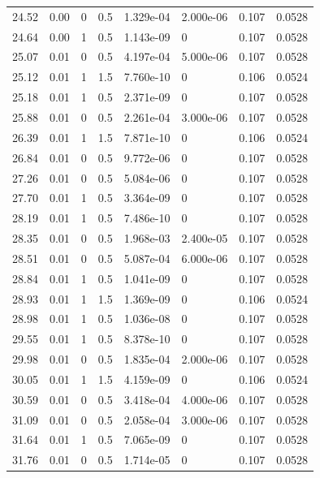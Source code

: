 \documentclass[preview]{standalone}
\begin{document}
{{{\begin{tabular}{L{1.2cm}C{1.2cm} C{0.3cm}C{0.5cm} C{1.4cm}C{1.4cm} C{1.4cm}C{1.4cm}}
  24.52  &  0.00  & 0     & 0.5 &  1.329e-04  & 2.000e-06  & 0.107 &  0.0528   \\ 
  24.64  &  0.00  & 1     & 0.5 &  1.143e-09  & 0  & 0.107 &  0.0528   \\ 
  25.07  &  0.01  & 0     & 0.5 &  4.197e-04  & 5.000e-06  & 0.107 &  0.0528   \\ 
  25.12  &  0.01  & 1     & 1.5 &  7.760e-10  & 0  & 0.106 &  0.0524   \\ 
  25.18  &  0.01  & 1     & 0.5 &  2.371e-09  & 0  & 0.107 &  0.0528   \\ 
  25.88  &  0.01  & 0     & 0.5 &  2.261e-04  & 3.000e-06  & 0.107 &  0.0528   \\ 
  26.39  &  0.01  & 1     & 1.5 &  7.871e-10  & 0  & 0.106 &  0.0524   \\ 
  26.84  &  0.01  & 0     & 0.5 &  9.772e-06  & 0  & 0.107 &  0.0528   \\ 
  27.26  &  0.01  & 0     & 0.5 &  5.084e-06  & 0  & 0.107 &  0.0528   \\ 
  27.70  &  0.01  & 1     & 0.5 &  3.364e-09  & 0  & 0.107 &  0.0528   \\ 
  28.19  &  0.01  & 1     & 0.5 &  7.486e-10  & 0  & 0.107 &  0.0528   \\ 
  28.35  &  0.01  & 0     & 0.5 &  1.968e-03  & 2.400e-05  & 0.107 &  0.0528   \\ 
  28.51  &  0.01  & 0     & 0.5 &  5.087e-04  & 6.000e-06  & 0.107 &  0.0528   \\ 
  28.84  &  0.01  & 1     & 0.5 &  1.041e-09  & 0  & 0.107 &  0.0528   \\ 
  28.93  &  0.01  & 1     & 1.5 &  1.369e-09  & 0  & 0.106 &  0.0524   \\ 
  28.98  &  0.01  & 1     & 0.5 &  1.036e-08  & 0  & 0.107 &  0.0528   \\ 
  29.55  &  0.01  & 1     & 0.5 &  8.378e-10  & 0  & 0.107 &  0.0528   \\ 
  29.98  &  0.01  & 0     & 0.5 &  1.835e-04  & 2.000e-06  & 0.107 &  0.0528   \\ 
  30.05  &  0.01  & 1     & 1.5 &  4.159e-09  & 0  & 0.106 &  0.0524   \\ 
  30.59  &  0.01  & 0     & 0.5 &  3.418e-04  & 4.000e-06  & 0.107 &  0.0528   \\ 
  31.09  &  0.01  & 0     & 0.5 &  2.058e-04  & 3.000e-06  & 0.107 &  0.0528   \\ 
  31.64  &  0.01  & 1     & 0.5 &  7.065e-09  & 0  & 0.107 &  0.0528   \\ 
  31.76  &  0.01  & 0     & 0.5 &  1.714e-05  & 0  & 0.107 &  0.0528   \\ 

\end{tabular}}}}
\end{document}
